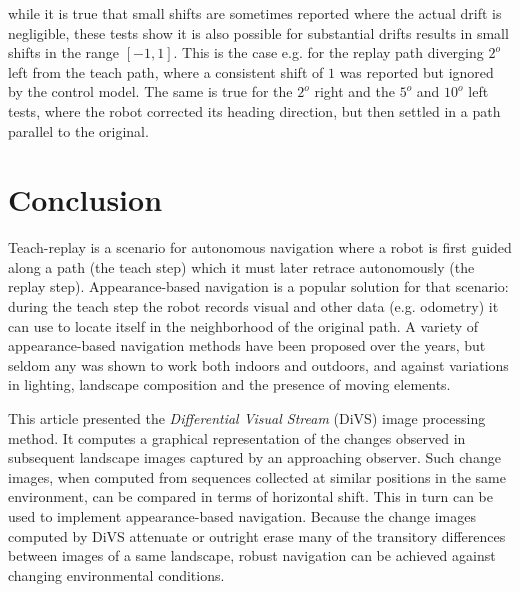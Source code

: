 \documentclass[twocolumn, 9pt,fleqn]{jsproceedings}
\begin{document}
while it is true that small shifts are sometimes reported where the actual drift is negligible, these tests show it is also possible for substantial drifts results in small shifts in the range $[-1, 1]$. This is the case e.g. for the replay path diverging $2^o$ left from the teach path, where a consistent shift of $1$ was reported but ignored by the control model. The same is true for the $2^o$ right and the $5^o$ and $10^o$ left tests, where the robot corrected its heading direction, but then settled in a path parallel to the original.

\section{Conclusion}

Teach-replay is a scenario for autonomous navigation where a robot is first guided along a path (the teach step) which it must later retrace autonomously (the replay step). Appearance-based navigation is a popular solution for that scenario: during the teach step the robot records visual and other data (e.g. odometry) it can use to locate itself in the neighborhood of the original path. A variety of appearance-based navigation methods have been proposed over the years, but seldom any was shown to work both indoors and outdoors, and against variations in lighting, landscape composition and the presence of moving elements.

This article presented the \textit{Differential Visual Stream} (DiVS) image processing method. It computes a graphical representation of the changes observed in subsequent landscape images captured by an approaching observer. Such change images, when computed from sequences collected at similar positions in the same environment, can be compared in terms of horizontal shift. This in turn can be used to implement appearance-based navigation. Because the change images computed by DiVS attenuate or outright erase many of the transitory differences between images of a same landscape, robust navigation can be achieved against changing environmental conditions.
\end{document}

